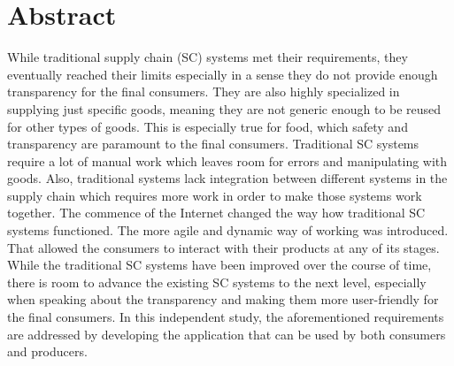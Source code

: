 \chapter*{Abstract}


While traditional supply chain (SC) systems met their requirements, they eventually reached their limits especially in a sense they do not provide enough transparency for the final consumers. They are also highly specialized in supplying just specific goods, meaning they are not generic enough to be reused for other types of goods. This is especially true for food, which safety and transparency are paramount to the final consumers. Traditional SC systems require a lot of manual work which leaves room for errors and manipulating with goods. Also, traditional systems lack integration between different systems in the supply chain which requires more work in order to make those systems work together. The commence of the Internet changed the way how traditional SC systems functioned. The more agile and dynamic way of working was introduced. That allowed the consumers to interact with their products at any of its stages. While the traditional SC systems have been improved over the course of time, there is room to advance the existing SC systems to the next level, especially when speaking about the transparency and making them more user-friendly for the final consumers. In this independent study, the aforementioned requirements are addressed by developing the application that can be used by both consumers and producers. 




